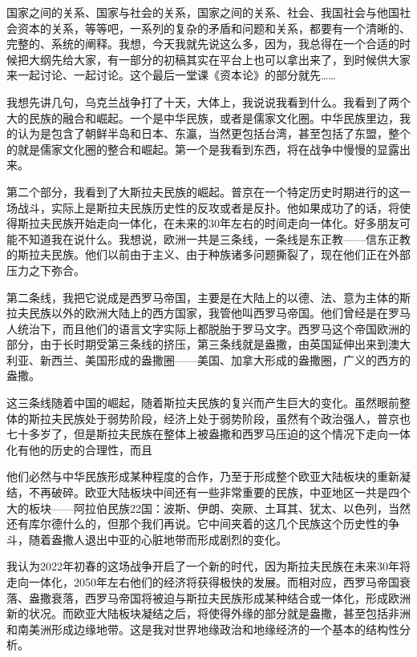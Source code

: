 \documentclass[UTF8, 12pt, a4paper]{ctexrep}
\begin{document}
国家之间的关系、国家与社会的关系，国家之间的关系、社会、我国社会与他国社会资本的关系，等等吧，一系列的复杂的矛盾和问题和关系，都要有一个清晰的、完整的、系统的阐释。我想，今天我就先说这么多，因为，我总得在一个合适的时候把大纲先给大家，有一部分的初稿其实在平台上也可以拿出来了，到时候供大家来一起讨论、一起讨论。这个最后一堂课《资本论》的部分就先……

我想先讲几句，乌克兰战争打了十天，大体上，我说说我看到什么。我看到了两个大的民族的融合和崛起。一个是中华民族，或者是儒家文化圈。中华民族里边，我的认为是包含了朝鲜半岛和日本、东瀛，当然更包括台湾，甚至包括了东盟，整个的就是儒家文化圈的整合和崛起。第一个是我看到东西，将在战争中慢慢的显露出来。

第二个部分，我看到了大斯拉夫民族的崛起。普京在一个特定历史时期进行的这一场战斗，实际上是斯拉夫民族历史性的反攻或者是反扑。他如果成功了的话，将使得斯拉夫民族开始走向一体化，在未来的30年左右的时间走向一体化。好多朋友可能不知道我在说什么。我想说，欧洲一共是三条线，一条线是东正教——信东正教的斯拉夫民族。他们以前由于主义、由于种族诸多问题撕裂了，现在他们正在外部压力之下弥合。

第二条线，我把它说成是西罗马帝国，主要是在大陆上的以德、法、意为主体的斯拉夫民族以外的欧洲大陆上的西方国家，我管他叫西罗马帝国。他们曾经是在罗马人统治下，而且他们的语言文字实际上都脱胎于罗马文字。西罗马这个帝国欧洲的部分，由于长时期受第三条线的挤压，第三条线就是盎撒，由英国延伸出来到澳大利亚、新西兰、美国形成的盎撒圈——美国、加拿大形成的盎撒圈，广义的西方的盎撒。

这三条线随着中国的崛起，随着斯拉夫民族的复兴而产生巨大的变化。虽然眼前整体的斯拉夫民族处于弱势阶段，经济上处于弱势阶段，虽然有个政治强人，普京也七十多岁了，但是斯拉夫民族在整体上被盎撒和西罗马压迫的这个情况下走向一体化有他的历史的合理性，而且

他们必然与中华民族形成某种程度的合作，乃至于形成整个欧亚大陆板块的重新凝结，不再破碎。欧亚大陆板块中间还有一些非常重要的民族，中亚地区一共是四个大的板块——阿拉伯民族22国：波斯、伊朗、突厥、土耳其、犹太、以色列，当然还有库尔德什么的，但那个我们再说。它中间夹着的这几个民族这个历史性的争斗，随着盎撒人退出中亚的心脏地带而形成剧烈的变化。

我认为2022年初春的这场战争开启了一个新的时代，因为斯拉夫民族在未来30年将走向一体化，2050年左右他们的经济将获得极快的发展。而相对应，西罗马帝国衰落、盎撒衰落，西罗马帝国将被迫与斯拉夫民族形成某种结合或一体化，形成欧洲新的状况。而欧亚大陆板块凝结之后，将使得外缘的部分就是盎撒，甚至包括非洲和南美洲形成边缘地带。这是我对世界地缘政治和地缘经济的一个基本的结构性分析。
\end{document}
